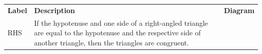         \begin{center}
      
      \label{m39368*id317997}
      
    \noindent
      \tablelasttail{}
      \begin{xtabular*}{\mytablewidth}[t]{|p{10\mystarwidth}|p{10\mystarwidth}|p{10\mystarwidth}|}\hline
    
    
        
                    \textbf{Label}
                   &
    
    
        
                    \textbf{Description}
                   &
    
    
        
                    \textbf{Diagram}
     \tabularnewline{}
    
    
        RHS &
    
    
        If the hypotenuse and one side of a right-angled triangle are equal to the hypotenuse and the respective side of another triangle, then the triangles are congruent. &
    

\end{xtabular*}
\end{center}
